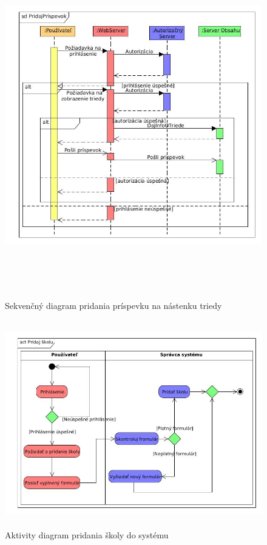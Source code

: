 \documentclass[slovak, 12pt, Times New Roman]{article}
\begin{document}
			\begin{figure}[!htb]
				\centering
				\includegraphics[width = 16cm, height = 15cm]{AddPostSequence.jpg}
				\caption{Sekvenčný diagram pridania príspevku na nástenku triedy}
				\label{fig:Reinforcement}
			\end{figure}
			\begin{figure}[!htb]
				\centering
				\includegraphics[width = 16cm, height = 9cm]{AddSchoolActivity.jpg}
				\caption{Aktivity diagram pridania školy do systému}
				\label{fig:Reinforcement}
			\end{figure}
\end{document}
